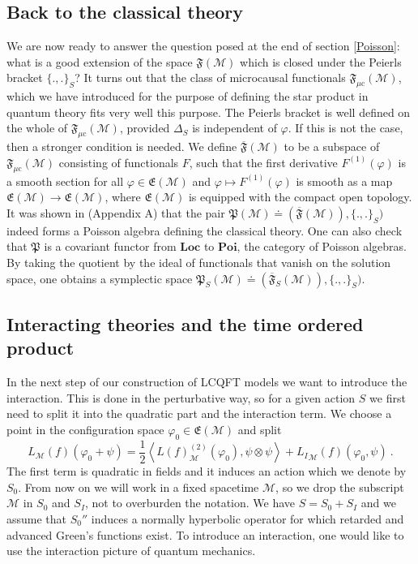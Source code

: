 \documentclass[12pt]{article}
\newcommand{\E}{\mathfrak{E}}
\newcommand{\fP}{\mathfrak{P}}
\newcommand{\F}{\mathfrak{F}}
\newcommand{\Mcal}{\mathcal{M}}
\newcommand{\Po}{\mathrm{\mathbf{Poi}}}
\newcommand{\Loc}{\mathrm{\mathbf{Loc}}}       %
\newcommand{\WF}{\mathrm{WF}}         %
\newcommand{\mc}{{\mu\mathrm{c}}}
\newcommand{\ph}{\varphi}
\newcommand{\Poi}[2]{\{#1,#2\}}
\newcommand{\1}{\mathds{1}}                         %
\newcommand{\be}{\begin{equation}}
\newcommand{\ee}{\end{equation}}
\begin{document}
{{\subsection{Back to the classical theory}\label{backtoclass}
We are now ready to answer the question posed at the end of section \ref{Poisson}: what is a good extension of the space $\F(\Mcal)$ which is closed under the Peierls bracket $\Poi{.}{.}_S$? It turns out that the class of microcausal functionals $\F_\mc(\Mcal)$, which we have introduced for the purpose of defining the star product in quantum theory fits very well this purpose. The Peierls bracket is well defined on the whole of $\F_\mc(\Mcal)$, provided $\Delta_S$ is independent of $\ph$. If this is not the case, then a stronger condition is needed. We define $\overline{\F}(\Mcal)$ to be a subspace of $\F_{\mc}(\Mcal)$  consisting of functionals $F$, such that the first derivative $F^{(1)}(\ph)$ is a smooth section for all $\ph\in\E(\Mcal)$ and 
$\ph\mapsto F^{(1)}(\ph)$ is smooth as a map $\E(\Mcal)\rightarrow \E(\Mcal)$, where $\E(\Mcal)$ is equipped with the compact open topology. It was shown in \cite{BFRej13} (Appendix A) that the pair $\fP(\Mcal)\doteq(\overline{\F}(\Mcal)),\{.,.\}_S)$ indeed forms a Poisson algebra defining the classical theory.
One can also check that $\fP$ is a covariant functor from $\Loc$ to $\Po$, the category of Poisson algebras. By taking the quotient by the ideal of functionals that vanish on the solution space, one obtains a symplectic space $\fP_S(\Mcal)\doteq(\overline{\F}_S(\Mcal)),\{.,.\}_S)$.
\subsection{Interacting theories and the time ordered product}
In the next step of our construction of LCQFT models we want to introduce the interaction. This is done in the perturbative way, so for a given action $S$ we first need to split it into the quadratic part and the interaction term. We choose a point in the configuration space $\ph_0\in\E(\Mcal)$ and split
\be
L_\Mcal(f)(\ph_0+\psi)=\frac12 \left< L(f)^{(2)}_\Mcal(\ph_0),\psi\otimes\psi\right>+{L_I}_\Mcal(f)(\ph_0,\psi) \ .
\ee
The first term is quadratic in fields and it induces an action which we denote by $S_0$. From now on we will work in a fixed spacetime $\Mcal$, so we drop the subscript $\Mcal$ in $S_0$ and $S_I$, not to overburden the notation. We have $S=S_0+S_I$ and we assume that $S_0''$ induces a normally hyperbolic operator for which retarded and advanced Green's functions exist. To introduce an interaction, one would like to use the interaction picture of quantum mechanics. 

}}
\end{document}
